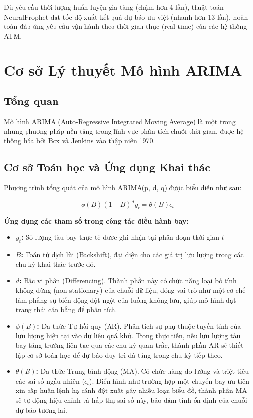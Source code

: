 \documentclass[12pt,a4paper]{article}
\begin{document}
Dù yêu cầu thời lượng huấn luyện gia tăng (chậm hơn 4 lần), thuật toán NeuralProphet đạt tốc độ xuất kết quả dự báo ưu việt (nhanh hơn 13 lần), hoàn toàn đáp ứng yêu cầu vận hành theo thời gian thực (real-time) của các hệ thống ATM.


\section{Cơ sở Lý thuyết Mô hình ARIMA}

\subsection{Tổng quan}

Mô hình ARIMA (Auto-Regressive Integrated Moving Average) là một trong những phương pháp nền tảng trong lĩnh vực phân tích chuỗi thời gian, được hệ thống hóa bởi Box và Jenkins vào thập niên 1970.

\subsection{Cơ sở Toán học và Ứng dụng Khai thác}

Phương trình tổng quát của mô hình ARIMA(p, d, q) được biểu diễn như sau:

\begin{equation}
\phi(B)(1-B)^d y_t = \theta(B) \epsilon_t
\end{equation}

\textbf{Ứng dụng các tham số trong công tác điều hành bay:}
\begin{itemize}
    \item \textbf{$y_t$:} Số lượng tàu bay thực tế được ghi nhận tại phân đoạn thời gian $t$.
    \item \textbf{$B$:} Toán tử dịch lùi (Backshift), đại diện cho các giá trị lưu lượng trong các chu kỳ khai thác trước đó.
    \item \textbf{$d$:} Bậc vi phân (Differencing). Thành phần này có chức năng loại bỏ tính không dừng (non-stationary) của chuỗi dữ liệu, đóng vai trò như một cơ chế làm phẳng sự biến động đột ngột của luồng không lưu, giúp mô hình đạt trạng thái cân bằng để phân tích.
    \item \textbf{$\phi(B)$:} Đa thức Tự hồi quy (AR). Phân tích sự phụ thuộc tuyến tính của lưu lượng hiện tại vào dữ liệu quá khứ. Trong thực tiễn, nếu lưu lượng tàu bay tăng trưởng liên tục qua các chu kỳ quan trắc, thành phần AR sẽ thiết lập cơ sở toán học để dự báo duy trì đà tăng trong chu kỳ tiếp theo.
    \item \textbf{$\theta(B)$:} Đa thức Trung bình động (MA). Có chức năng đo lường và triệt tiêu các sai số ngẫu nhiên ($\epsilon_t$). Điển hình như trường hợp một chuyến bay ưu tiên xin cấp huấn lệnh hạ cánh đột xuất gây nhiễu loạn biểu đồ, thành phần MA sẽ tự động hiệu chỉnh và hấp thụ sai số này, bảo đảm tính ổn định của chuỗi dự báo tương lai.
\end{itemize}
\end{document}
